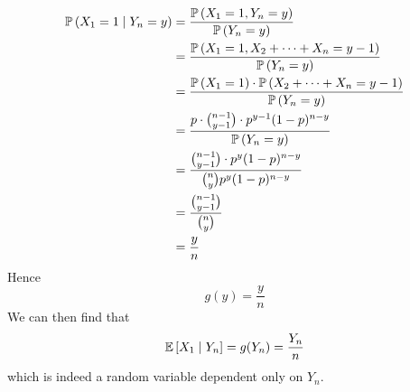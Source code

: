\begin{align*}
	\mathbb{P}\left({X_1 = 1 \mid Y_n = y}\right) & = \frac{\mathbb{P}\left({X_1 = 1, Y_n = y}\right)}{\mathbb{P}\left({Y_n = y}\right)}                             \\
	                            & = \frac{\mathbb{P}\left({X_1 = 1, X_2 + \dots + X_n = y-1}\right)}{\mathbb{P}\left({Y_n = y}\right)}             \\
	                            & = \frac{\mathbb{P}\left({X_1 = 1}\right) \cdot \mathbb{P}\left({X_2 + \dots + X_n = y-1}\right)}{\mathbb{P}\left({Y_n = y}\right)} \\
	                            & = \frac{p \cdot \binom{n-1}{y-1} \cdot p^{y-1}(1-p)^{n-y}}{\mathbb{P}\left({Y_n = y}\right)}   \\
	                            & = \frac{\binom{n-1}{y-1} \cdot p^y(1-p)^{n-y}}{\binom{n}{y}p^y (1-p)^{n-y}}  \\
	                            & = \frac{\binom{n-1}{y-1}}{\binom{n}{y}}                                      \\
	                            & = \frac{y}{n}
\end{align*}
Hence
\[
	g(y) = \frac{y}{n}
\]
We can then find that
\[
	\mathbb{E}\left[{X_1 \mid Y_n}\right] = g(Y_n) = \frac{Y_n}{n}
\]
which is indeed a random variable dependent only on \(Y_n\).

